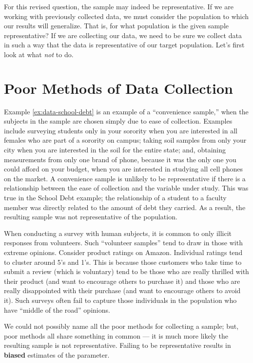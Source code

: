 \documentclass[]{book}
\theoremstyle{plain}
\theoremstyle{mydefn}
\theoremstyle{myexmpl}
\theoremstyle{remark}
\begin{document}
For this revised question, the sample may indeed be representative. If
we are working with previously collected data, we must consider the
population to which our results will generalize. That is, for what
population is the given sample representative? If we are collecting our
data, we need to be sure we collect data in such a way that the data is
representative of our target population. Let's first look at what
\emph{not} to do.

\section{Poor Methods of Data
Collection}\label{poor-methods-of-data-collection}

Example \ref{ex:data-school-debt} is an example of a ``convenience
sample,'' when the subjects in the sample are chosen simply due to ease
of collection. Examples include surveying students only in your sorority
when you are interested in all females who are part of a sorority on
campus; taking soil samples from only your city when you are interested
in the soil for the entire state; and, obtaining measurements from only
one brand of phone, because it was the only one you could afford on your
budget, when you are interested in studying all cell phones on the
market. A convenience sample is unlikely to be representative if there
is a relationship between the ease of collection and the variable under
study. This was true in the School Debt example; the relationship of a
student to a faculty member was directly related to the amount of debt
they carried. As a result, the resulting sample was not representative
of the population.

When conducting a survey with human subjects, it is common to only
illicit responses from volunteers. Such ``volunteer samples'' tend to
draw in those with extreme opinions. Consider product ratings on Amazon.
Individual ratings tend to cluster around 5's and 1's. This is because
those customers who take time to submit a review (which is voluntary)
tend to be those who are really thrilled with their product (and want to
encourage others to purchase it) and those who are really disappointed
with their purchase (and want to encourage others to avoid it). Such
surveys often fail to capture those individuals in the population who
have ``middle of the road'' opinions.

We could not possibly name all the poor methods for collecting a sample;
but, poor methods all share something in common --- it is much more
likely the resulting sample is not representative. Failing to be
representative results in \textbf{biased} estimates of the parameter.
\end{document}
